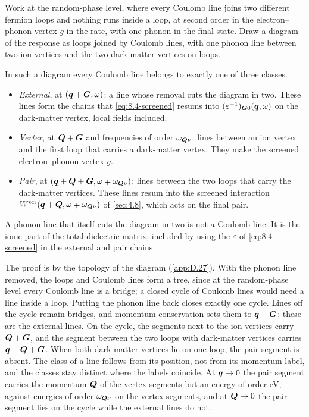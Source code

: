 Work at the random-phase level, where every Coulomb line joins two different fermion loops and nothing runs inside a loop, at second order in the electron--phonon vertex $g$ in the rate, with one phonon in the final state. Draw a diagram of the response as loops joined by Coulomb lines, with one phonon line between two ion vertices and the two dark-matter vertices on loops.
\begin{keyresult}
In such a diagram every Coulomb line belongs to exactly one of three classes.
\begin{itemize}
  \item \emph{External}, at $(\bm{q} + \bm{G}, \omega)$: a line whose removal cuts the diagram in two. These lines form the chains that \cref{eq:8.4-screened} resums into $(\varepsilon^{-1})_{\bm{G}0}(\bm{q},\omega)$ on the dark-matter vertex, local fields included.
  \item \emph{Vertex}, at $\bm{Q} + \bm{G}$ and frequencies of order $\omega_{\bm{Q}\nu}$: lines between an ion vertex and the first loop that carries a dark-matter vertex. They make the screened electron--phonon vertex $g$.
  \item \emph{Pair}, at $(\bm{q} + \bm{Q} + \bm{G}, \omega \mp \omega_{\bm{Q}\nu})$: lines between the two loops that carry the dark-matter vertices. These lines resum into the screened interaction $W^{\mathrm{scr}}(\bm{q} + \bm{Q}, \omega \mp \omega_{\bm{Q}\nu})$ of \cref{sec:4.8}, which acts on the final pair.
\end{itemize}
A phonon line that itself cuts the diagram in two is not a Coulomb line. It is the ionic part of the total dielectric matrix, included by using the $\varepsilon$ of \cref{eq:8.4-screened} in the external and pair chains.
\end{keyresult}
\noindent The proof is by the topology of the diagram (\cref{app:D.27}). With the phonon line removed, the loops and Coulomb lines form a tree, since at the random-phase level every Coulomb line is a bridge; a closed cycle of Coulomb lines would need a line inside a loop. Putting the phonon line back closes exactly one cycle. Lines off the cycle remain bridges, and momentum conservation sets them to $\bm{q} + \bm{G}$; these are the external lines. On the cycle, the segments next to the ion vertices carry $\bm{Q} + \bm{G}$, and the segment between the two loops with dark-matter vertices carries $\bm{q} + \bm{Q} + \bm{G}$. When both dark-matter vertices lie on one loop, the pair segment is absent. The class of a line follows from its position, not from its momentum label, and the classes stay distinct where the labels coincide. At $\bm{q} \to 0$ the pair segment carries the momentum $\bm{Q}$ of the vertex segments but an energy of order eV, against energies of order $\omega_{\bm{Q}\nu}$ on the vertex segments, and at $\bm{Q} \to 0$ the pair segment lies on the cycle while the external lines do not.

